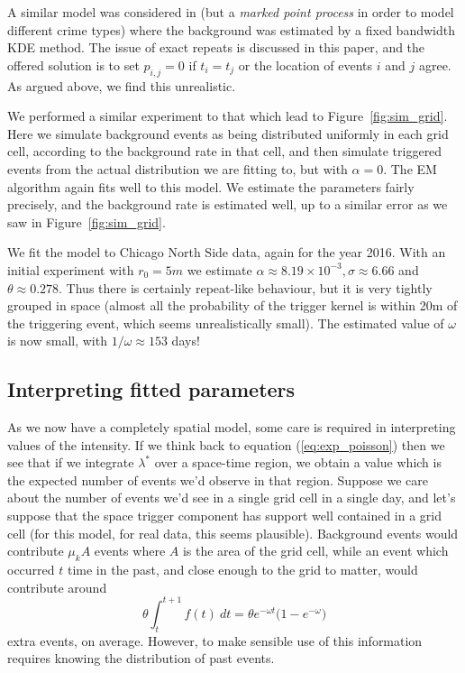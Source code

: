 \documentclass[twoside,a4paper]{article}
\theoremstyle{plain}
\theoremstyle{definition}
\begin{document}
A similar model was considered in \cite{mohler} (but a \emph{marked point process} in order
to model different crime types) where the background was estimated by a fixed bandwidth KDE
method.  The issue of exact repeats is discussed in this paper, and the offered solution is
to set $p_{i,j}=0$ if $t_i=t_j$ or the location of events $i$ and $j$ agree.  As argued above,
we find this unrealistic.

We performed a similar experiment to that which lead to Figure~\ref{fig:sim_grid}.  Here we
simulate background events as being distributed uniformly in each grid cell, according to
the background rate in that cell, and then simulate triggered events from the actual distribution
we are fitting to, but with $\alpha=0$.  The EM algorithm again fits well to this model.
We estimate the parameters fairly precisely, and the background rate is estimated well,
up to a similar error as we saw in Figure~\ref{fig:sim_grid}.

We fit the model to Chicago North Side data, again for the year 2016.  With an initial
experiment with $r_0=5m$ we estimate $\alpha\approx 8.19\times 10^{-3}, \sigma \approx 6.66$
and $\theta\approx 0.278$.  Thus there is certainly repeat-like behaviour, but it is very
tightly grouped in space (almost all the probability of the trigger kernel is within
20m of the triggering event, which seems unrealistically small).  The estimated value of
$\omega$ is now small, with $1/\omega \approx 153$ days!




\subsection{Interpreting fitted parameters}\label{sec:int_fit_params}

As we now have a completely spatial model, some care is required in interpreting values of
the intensity.  If we think back to equation (\ref{eq:exp_poisson}) then we see that if
we integrate $\lambda^*$ over a space-time region, we obtain a value which is the expected
number of events we'd observe in that region.  Suppose we care about the number of events
we'd see in a single grid cell in a single day, and let's suppose that the space trigger
component has support well contained in a grid cell (for this model, for real data, this
seems plausible).  Background events would contribute $\mu_k A$ events where $A$ is the
area of the grid cell, while an event which occurred $t$ time in the past, and close enough
to the grid to matter, would contribute around
\[ \theta \int_{t}^{t+1} f(t) \ dt = \theta e^{-\omega t} \big( 1 - e^{-\omega} \big) \]
extra events, on average.  However, to make sensible use of this information requires knowing
the distribution of past events.
\end{document}
